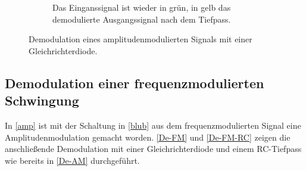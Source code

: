 \begin{figure}[t!]
\begin{subfigure}[t]{0.5\textwidth}
		\caption{Das Einganssignal ist wieder in grün, in gelb das demodulierte Ausgangssignal nach dem Tiefpass.}
		\label{nachRC}
	\end{subfigure}
	\caption{Demodulation eines amplitudenmodulierten Signals mit einer Gleichrichterdiode.}
\end{figure}

\subsection{Demodulation einer frequenzmodulierten Schwingung}

In \autoref{amp} ist mit der Schaltung in \autoref{blub} aus dem frequenzmodulierten Signal eine Amplitudenmodulation gemacht worden. \autoref{De-FM} und \autoref{De-FM-RC} zeigen die anschließende Demodulation mit einer Gleichrichterdiode und einem RC-Tiefpass wie bereits in \autoref{De-AM} durchgeführt.

